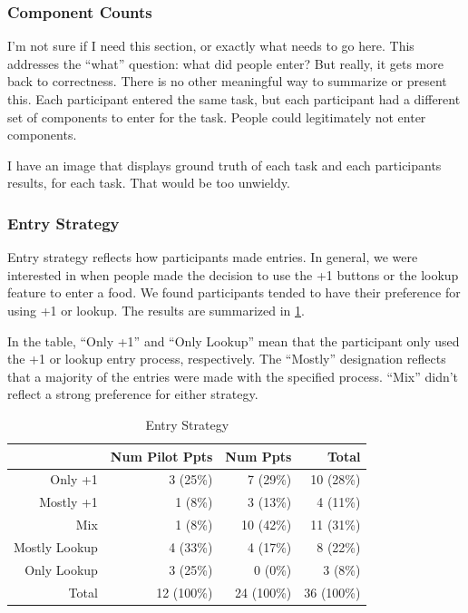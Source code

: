 \subsubsection{Component Counts}
I'm not sure if I need this section, or exactly what needs to go here. This addresses the ``what'' question: what did people enter? But really, it gets more back to correctness. There is no other meaningful way to summarize or present this. Each participant entered the same task, but each participant had a different set of components to enter for the task. People could legitimately not enter components. 

I have an image that displays ground truth of each task and each participants results, for each task. That would be too unwieldy. 


\subsubsection{Entry Strategy}
Entry strategy reflects how participants made entries. In general, we were interested in when people made the decision to use the +1 buttons or the lookup feature to enter a food. We found participants tended to have their preference for using +1 or lookup. The results are summarized in \ref{tab:inlab_strategy}. 

In the table, ``Only +1'' and ``Only Lookup'' mean that the participant only used the +1 or lookup entry process, respectively. The ``Mostly'' designation reflects that a majority of the entries were made with the specified process. ``Mix'' didn't reflect a strong preference for either strategy. 


\begin{table}[htbp]
\small
  \centering
  \caption{Entry Strategy}
    \begin{tabular}{rrrr}
    \toprule
          & Num Pilot Ppts & Num Ppts & Total \\
    \midrule
    Only +1 & 3 (25\%) & 7 (29\%) & 10 (28\%) \\
    Mostly +1 & 1 (8\%) & 3 (13\%) & 4 (11\%) \\
    Mix   & 1 (8\%) & 10 (42\%) & 11 (31\%) \\
    Mostly Lookup & 4 (33\%) & 4 (17\%) & 8 (22\%) \\
    Only Lookup & 3 (25\%) & 0 (0\%) & 3 (8\%) \\
\midrule
    Total & 12 (100\%) & 24 (100\%) & 36 (100\%) \\
    \bottomrule
    \end{tabular}%
  \label{tab:inlab_strategy}%
\end{table}%


